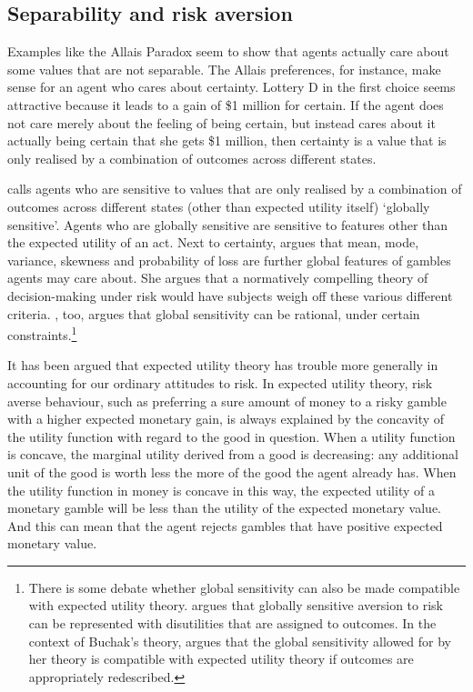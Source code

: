 \subsection{Separability and risk aversion}\label{subs53}

Examples like the Allais Paradox seem to show that agents actually care about some values that are not separable. The Allais preferences, for instance, make sense for an agent who cares about certainty. Lottery D in the first choice seems attractive because it leads to a gain of \$1 million for certain. If the agent does not care merely about the feeling of being certain, but instead cares about it actually being certain that she gets \$1 million, then certainty is a value that is only realised by a combination of outcomes across different states.

\citet{Buchak2013} calls agents who are sensitive to values that are only realised by a combination of outcomes across different states (other than expected utility itself) `globally sensitive'. Agents who are globally sensitive are sensitive to features other than the expected utility of an act. Next to certainty, \citet{Lopes1981, Lopes1996} argues that mean, mode, variance, skewness and probability of loss are further global features of gambles agents may care about. She argues that a normatively compelling theory of decision-making under risk would have subjects weigh off these various different criteria. \citet{Buchak2013}, too, argues that global sensitivity can be rational, under certain constraints.\footnote{There is some debate whether global sensitivity can also be made compatible with expected utility theory. \citet{Weirich1986} argues that globally sensitive aversion to risk can be represented with disutilities that are assigned to outcomes. In the context of Buchak's theory, \citet{Pettigrew2014} argues that the global sensitivity allowed for by her theory is compatible with expected utility theory if outcomes are appropriately redescribed.}

It has been argued that expected utility theory has trouble more generally in accounting for our ordinary attitudes to risk. In expected utility theory, risk averse behaviour, such as preferring a sure amount of money to a risky gamble with a higher expected monetary gain, is always explained by the concavity of the utility function with regard to the good in question. When a utility function is concave, the marginal utility derived from a good is decreasing: any additional unit of the good is worth less the more of the good the agent already has. When the utility function in money is concave in this way, the expected utility of a monetary gamble will be less than the utility of the expected monetary value. And this can mean that the agent rejects gambles that have positive expected monetary value.

